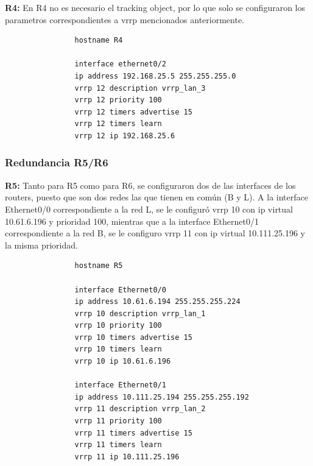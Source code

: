 			\textbf{R4:}
			En R4 no es necesario el tracking object, por lo que solo se configuraron
			los parametros correspondientes a vrrp mencionados anteriormente.
			\begin{verbatim}
				hostname R4

				interface ethernet0/2
				ip address 192.168.25.5 255.255.255.0
				vrrp 12 description vrrp_lan_3
				vrrp 12 priority 100
				vrrp 12 timers advertise 15
				vrrp 12 timers learn
				vrrp 12 ip 192.168.25.6
			\end{verbatim}

		\subsubsection{Redundancia R5/R6}
			\textbf{R5:}
			Tanto para R5 como para R6, se configuraron dos de las interfaces de los
			routers, puesto que son dos redes las que tienen en común (B y L). A la
			interface Ethernet0/0 correspondiente a la red L, se le configuró vrrp 10
			con ip virtual 10.61.6.196 y prioridad 100, mientras que a la interface 
			Ethernet0/1 correspondiente a la red B, se le configuro vrrp 11 con ip 
			virtual 10.111.25.196 y la misma prioridad.
			\begin{verbatim}
				hostname R5

				interface Ethernet0/0
				ip address 10.61.6.194 255.255.255.224
				vrrp 10 description vrrp_lan_1
				vrrp 10 priority 100
				vrrp 10 timers advertise 15
				vrrp 10 timers learn
				vrrp 10 ip 10.61.6.196

				interface Ethernet0/1
				ip address 10.111.25.194 255.255.255.192
				vrrp 11 description vrrp_lan_2
				vrrp 11 priority 100
				vrrp 11 timers advertise 15
				vrrp 11 timers learn
				vrrp 11 ip 10.111.25.196
			\end{verbatim}


